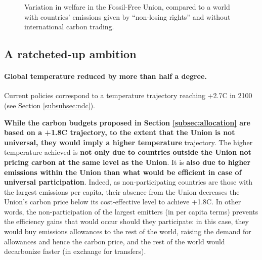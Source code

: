 \documentclass[12pt,english]{article}
\begin{document}
\begin{figure}[h!] 
  \caption{Variation in welfare in the Fossil-Free Union, compared to a world with countries' emissions given by ``non-losing rights'' and without international carbon trading.}\label{fig:var_ede}
\end{figure}


\subsection{A ratcheted-up ambition\label{subsec:ambition}}

\paragraph{Global temperature reduced by more than half a degree.}
Current policies correspond to a temperature trajectory reaching +2.7\textdegree{}C in 2100 (see Section \ref{subsubsec:ndc}). %

\textbf{While the carbon budgets proposed in Section \ref{subsec:allocation} are based on a +1.8\textdegree{}C trajectory, to the extent that the Union is not universal, they would imply a higher temperature} trajectory. The higher temperature achieved is \textbf{not only due to countries outside the Union not pricing carbon at the same level as the Union}. %
It is \textbf{also due to higher emissions within the Union than what would be efficient in case of universal participation}. Indeed, as non-participating countries are those with the largest emissions per capita, their absence from the Union decreases the Union's carbon price below its cost-effective level to achieve +1.8\textdegree{}C. In other words, the non-participation of the largest emitters (in per capita terms) prevents the efficiency gains that would occur should they participate: in this case, they would buy emissions allowances to the rest of the world, raising the demand for allowances and hence the carbon price, and the rest of the world would decarbonize faster (in exchange for transfers). 
\end{document}

